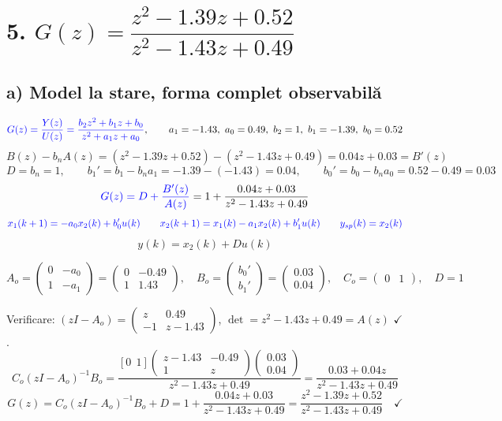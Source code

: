 \documentclass[10pt,a4paper]{article}
\begin{document}
\section*{5. $G(z)=\dfrac{z^2-1.39z+0.52}{z^2-1.43z+0.49}$}

\subsection*{a) Model la stare, forma complet observabilă}
$$\textcolor{blue}{G(z)=\frac{Y(z)}{U(z)}=\frac{b_2z^2+b_1z+b_0}{z^2+a_1z+a_0}},\qquad a_1=-1.43,\ a_0=0.49,\ b_2=1,\ b_1=-1.39,\ b_0=0.52$$
$$B(z)-b_nA(z)=(z^2-1.39z+0.52)-(z^2-1.43z+0.49)=0.04z+0.03=B'(z)$$
$$D=b_n=1,\qquad b_1'=b_1-b_na_1=-1.39-(-1.43)=0.04,\qquad b_0'=b_0-b_na_0=0.52-0.49=0.03$$
$$\textcolor{blue}{G(z)=D+\frac{B'(z)}{A(z)}}=1+\frac{0.04z+0.03}{z^2-1.43z+0.49}$$
$$\color{blue}x_1(k+1)=-a_0x_2(k)+b_0'u(k)\qquad x_2(k+1)=x_1(k)-a_1x_2(k)+b_1'u(k)\qquad y_{sp}(k)=x_2(k)$$
$$y(k)=x_2(k)+Du(k)$$
\begin{res}
$$A_o=\begin{pmatrix}0&-a_0\\1&-a_1\end{pmatrix}=\begin{pmatrix}0&-0.49\\1&1.43\end{pmatrix},\quad
B_o=\begin{pmatrix}b_0'\\b_1'\end{pmatrix}=\begin{pmatrix}0.03\\0.04\end{pmatrix},\quad
C_o=\begin{pmatrix}0&1\end{pmatrix},\quad D=1$$
\end{res}
Verificare: $(zI-A_o)=\begin{pmatrix}z&0.49\\-1&z-1.43\end{pmatrix}$, $\det=z^2-1.43z+0.49=A(z)$ $\checkmark$.
$$C_o(zI-A_o)^{-1}B_o=\frac{[0\ \ 1]\begin{pmatrix}z-1.43&-0.49\\1&z\end{pmatrix}\begin{pmatrix}0.03\\0.04\end{pmatrix}}{z^2-1.43z+0.49}=\frac{0.03+0.04z}{z^2-1.43z+0.49}$$
$$G(z)=C_o(zI-A_o)^{-1}B_o+D=1+\frac{0.04z+0.03}{z^2-1.43z+0.49}=\frac{z^2-1.39z+0.52}{z^2-1.43z+0.49}\quad\checkmark$$
\end{document}
